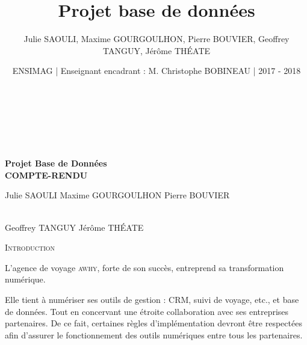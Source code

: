 \documentclass[french]{article}
\title{Projet base de données}
\author{Julie SAOULI, Maxime GOURGOULHON, Pierre BOUVIER, Geoffrey TANGUY, Jérôme THÉATE}
\date{ENSIMAG | Enseignant encadrant : M. Christophe BOBINEAU | 2017 - 2018 }
\theoremstyle{break}
\begin{document}
\renewcommand*\contentsname{\huge{Table des matières\vspace{1cm}}}
\begin{titlepage}
\begin{center}
\text{  }\\
\text{  }\\
\text{  }\\
\text{  }\\
\textcolor{dorure3}{\textbf{{\fontsize{45}{45}\selectfont Projet Base de Données}}}\\
\vspace{0.5cm}
\textcolor{dorure3}{\textbf{\LARGE{COMPTE-RENDU}}}
\end{center}
\vspace{3cm}
\begin{center}
\end{center}

\vspace{4.0cm}
\begin{center}
Julie SAOULI \hspace{1.5cm} Maxime GOURGOULHON  \hspace{1.5cm} Pierre BOUVIER
\end{center}
\\
\hspace{4.2cm} Geoffrey TANGUY \hspace{3cm} Jérôme THÉATE
\\
\vspace{0.2cm}
\begin{center}
\large{\@date}
\end{center}
\end{titlepage}
\clearpage

\begin{Large}
\tableofcontents{}
\end{Large}
\clearpage







\textsc{\textcolor{dorure2}{\LARGE{Introduction}}}
\vspace{1cm}

L'agence de voyage \textsc{awhy}, forte de son succès, entreprend sa transformation numérique.

Elle tient à numériser ses outils de gestion : CRM, suivi de voyage, etc., et base de données. Tout en concervant une étroite collaboration avec ses entreprises partenaires. De ce fait, certaines règles d'implémentation devront être respectées afin d'assurer le fonctionnement des outils numériques entre tous les partenaires.\\
\end{document}
